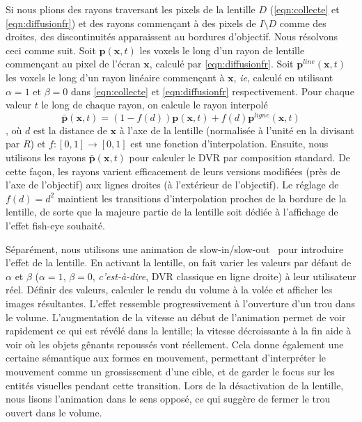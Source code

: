 Si nous plions des rayons traversant les pixels de la lentille $ D $ (\autoref{eqn:collecte} et \autoref{eqn:diffusionfr}) et des rayons commençant à des pixels de $ I \setminus D $ comme des droites, des discontinuités apparaissent au bordures d'objectif. Nous résolvons ceci comme suit. Soit $ \mathbf{p}(\mathbf{x}, t) $ les voxels le long d'un rayon de lentille commençant au pixel de l'écran $ \mathbf{x} $, calculé par \autoref{eqn:diffusionfr}. Soit $ \mathbf{p}^{line}(\mathbf{x}, t) $ les voxels le long d'un rayon linéaire commençant à $ \mathbf{x} $, \emph{ie}, calculé en utilisant $ \alpha = 1 $ et $ \beta = 0 $ dans \autoref{eqn:collecte} et \autoref{eqn:diffusionfr} respectivement. Pour chaque valeur $ t $ le long de chaque rayon, on calcule le rayon interpolé
\begin{equation}
\bar{\mathbf{p}}(\mathbf{x}, t) = (1-f(d)) \mathbf{p}(\mathbf{x}, t) + f(d) \mathbf{p}^{ligne}(\mathbf{x}, t)
\end{equation},
 où $ d $ est la distance de $ \mathbf{x} $ à l'axe de la lentille (normalisée à l'unité en la divisant par $ R $) et $ f: [0,1] \rightarrow [0,1] $ est une fonction d'interpolation. Ensuite, nous utilisons les rayons $ \bar{\mathbf{p}}(\mathbf{x}, t) $ pour calculer le DVR par composition standard. De cette façon, les rayons varient efficacement de leurs versions modifiées (près de l'axe de l'objectif) aux lignes droites (à l'extérieur de l'objectif). Le réglage de $ f(d) = d^2 $ maintient les transitions d'interpolation proches de la bordure de la lentille, de sorte que la majeure partie de la lentille soit dédiée à l'affichage de l'effet fish-eye souhaité.

Séparément, nous utilisons une animation de slow-in/slow-out \, \cite{Dragicevic:2011:TDA:1978942.1979233} pour introduire l'effet de la lentille. En activant la lentille, on fait varier les valeurs par défaut de $ \alpha $ et $ \beta $ ($ \alpha = 1 $, $ \beta = 0 $, \emph{c'est-à-dire}, DVR classique en ligne droite) à leur utilisateur réel. Définir des valeurs, calculer le rendu du volume à la volée et afficher les images résultantes. L'effet ressemble progressivement à l'ouverture d'un trou dans le volume. L'augmentation de la vitesse au début de l'animation permet de voir rapidement ce qui est révélé dans la lentille; la vitesse décroissante à la fin aide à voir où les objets gênants repoussés vont réellement. Cela donne également une certaine sémantique aux formes en mouvement, permettant d'interpréter le mouvement comme un grossissement d'une cible, et de garder le focus sur les entités visuelles pendant cette transition. Lors de la désactivation de la lentille, nous lisons l'animation dans le sens opposé, ce qui suggère de fermer le trou ouvert dans le volume.

